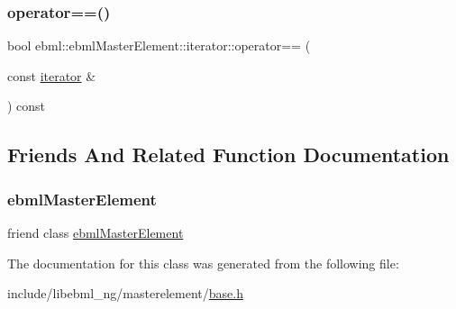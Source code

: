 \mbox{\label{classebml_1_1ebmlMasterElement_1_1iterator_afb3fe9d5db619b912eec528d2b2d71c5}} 
\subsubsection{\texorpdfstring{operator==()}{operator==()}}
{\footnotesize\ttfamily bool ebml\+::ebml\+Master\+Element\+::iterator\+::operator== (\begin{DoxyParamCaption}\item[{const \mbox{\hyperlink{classebml_1_1ebmlMasterElement_1_1iterator}{iterator}} \&}]{ }\end{DoxyParamCaption}) const}



\subsection{Friends And Related Function Documentation}
\mbox{\label{classebml_1_1ebmlMasterElement_1_1iterator_ad88e86cba72e9332a4693c1c6009b281}} 
\subsubsection{\texorpdfstring{ebml\+Master\+Element}{ebmlMasterElement}}
{\footnotesize\ttfamily friend class \mbox{\hyperlink{classebml_1_1ebmlMasterElement}{ebml\+Master\+Element}}\hspace{0.3cm}{\ttfamily [friend]}}



The documentation for this class was generated from the following file\+:\begin{DoxyCompactItemize}
\item 
include/libebml\+\_\+ng/masterelement/\mbox{\hyperlink{masterelement_2base_8h}{base.\+h}}\end{DoxyCompactItemize}
